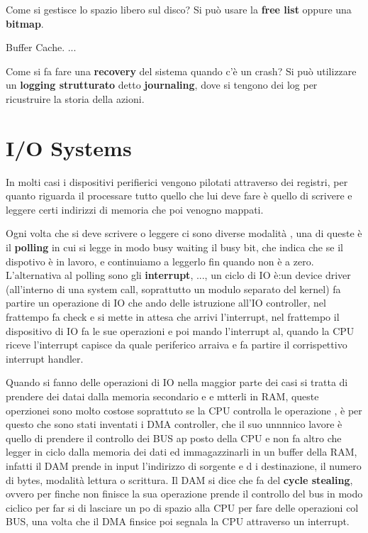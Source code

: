 \documentclass[12pt]{article}
\begin{document}
Come si gestisce lo spazio libero sul disco? Si pu\`o usare la \textbf{free list} oppure una \textbf{bitmap}.

Buffer Cache. ...

Come si fa fare una \textbf{recovery} del sistema quando c'\`e un crash? Si pu\`o utilizzare un \textbf{logging strutturato} detto \textbf{journaling}, dove si tengono dei log per ricustruire la storia della azioni.


\newpage
\section{I/O Systems}
In molti casi i dispositivi perifierici vengono pilotati attraverso dei registri, per quanto riguarda il processare tutto quello che lui deve fare \`e quello di scrivere e leggere certi indirizzi di memoria che poi venogno mappati.

Ogni volta che si deve scrivere o leggere ci sono diverse modalit\`a , una di queste \`e il \textbf{polling} in cui si legge in modo busy waiting il busy bit, che indica che se il dispotivo \`e in lavoro, e continuiamo a leggerlo fin quando non \`e a zero. L'alternativa al polling sono gli \textbf{interrupt}, ..., un ciclo di IO \`e:un device driver (all'interno di una system call, soprattutto un modulo separato del kernel) fa partire un operazione di IO che ando delle istruzione all'IO controller, nel frattempo fa check e si mette in attesa che arrivi l'interrupt, nel frattempo il dispositivo di IO fa le sue operazioni e poi mando l'interrupt al, quando la CPU riceve l'interrupt capisce da quale periferico arraiva e fa partire il corrispettivo interrupt handler.

Quando si fanno delle operazioni di IO nella maggior parte dei casi si tratta di prendere dei datai dalla memoria secondario e e mtterli in RAM, queste operzionei sono molto costose soprattuto se la CPU controlla le operazione , \`e per questo che sono stati inventati i DMA controller, che il suo unnnnico lavore \`e quello di prendere il controllo dei BUS ap posto della CPU  e non fa altro che legger in ciclo dalla memoria dei dati ed immagazzinarli in un buffer della RAM, infatti il DAM prende in input l'indirizzo di sorgente e d i destinazione, il numero di bytes, modalit\`a lettura o scrittura. Il DAM si dice che fa del \textbf{cycle stealing}, ovvero per finche non finisce la sua operazione prende il controllo del bus in modo ciclico per far si di lasciare un po di spazio alla CPU per fare delle operazioni col BUS, una volta che il DMA finsice poi segnala la CPU attraverso un interrupt.
\end{document}
